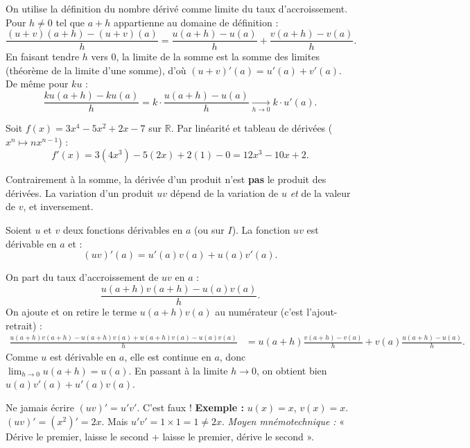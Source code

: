 \documentclass[11pt]{article}
\newcommand{\cle}[1]{{\popxbold\color{popdark}#1}}
\newcounter{popsec}
\newcounter{popsub}
\newcommand{\courssub}[1]{%
  \stepcounter{popsub}%
  \par\vspace{9pt}\noindent{\popxbold\fontsize{11.5}{13}\selectfont\color{popink}{\color{poporange}\thepopsec.\thepopsub}\hspace{6pt}#1}\par\nopagebreak\vspace{4pt}
}
\begin{document}
\begin{experience}
On utilise la définition du nombre dérivé comme limite du taux d'accroissement.
Pour $h \neq 0$ tel que $a+h$ appartienne au domaine de définition :
\[
\frac{(u+v)(a+h) - (u+v)(a)}{h} = \frac{u(a+h)-u(a)}{h} + \frac{v(a+h)-v(a)}{h}.
\]
En faisant tendre $h$ vers $0$, la limite de la somme est la somme des limites (théorème de la limite d'une somme), d'où $(u+v)'(a) = u'(a)+v'(a)$.
De même pour $ku$ :
\[
\frac{ku(a+h)-ku(a)}{h} = k \cdot \frac{u(a+h)-u(a)}{h} \xrightarrow[h\to 0]{} k \cdot u'(a).
\]
\end{experience}

\begin{exemplebox}
Soit $f(x) = 3x^4 - 5x^2 + 2x - 7$ sur $\mathbb{R}$.
Par linéarité et tableau de dérivées ($x^n \mapsto nx^{n-1}$) :
\[
f'(x) = 3(4x^3) - 5(2x) + 2(1) - 0 = 12x^3 - 10x + 2.
\]
\end{exemplebox}

\courssub{Dérivée d'un produit}

Contrairement à la somme, la dérivée d'un produit n'est \textbf{pas} le produit des dérivées. La variation d'un produit $uv$ dépend de la variation de $u$ \emph{et} de la valeur de $v$, et inversement.

\begin{propriete}
Soient $u$ et $v$ deux fonctions dérivables en $a$ (ou sur $I$). La fonction $uv$ est dérivable en $a$ et :
\[
(uv)'(a) = u'(a)v(a) + u(a)v'(a).
\]
\end{propriete}

\begin{experience}
On part du taux d'accroissement de $uv$ en $a$ :
\[
\frac{u(a+h)v(a+h) - u(a)v(a)}{h}.
\]
On ajoute et on retire le terme $u(a+h)v(a)$ au numérateur (c'est l'\cle{ajout-retrait}) :
\begin{align*}
\frac{u(a+h)v(a+h) - u(a+h)v(a) + u(a+h)v(a) - u(a)v(a)}{h}
&= u(a+h)\frac{v(a+h)-v(a)}{h} + v(a)\frac{u(a+h)-u(a)}{h}.
\end{align*}
Comme $u$ est dérivable en $a$, elle est continue en $a$, donc $\lim_{h\to 0} u(a+h) = u(a)$.
En passant à la limite $h \to 0$, on obtient bien $u(a)v'(a) + u'(a)v(a)$.
\end{experience}

\begin{attention}
Ne jamais écrire $(uv)' = u'v'$. C'est faux !
\textbf{Exemple :} $u(x)=x$, $v(x)=x$. $(uv)' = (x^2)' = 2x$. Mais $u'v' = 1 \times 1 = 1 \neq 2x$.
\emph{Moyen mnémotechnique :} « Dérive le premier, laisse le second + laisse le premier, dérive le second ».
\end{attention}
\end{document}
